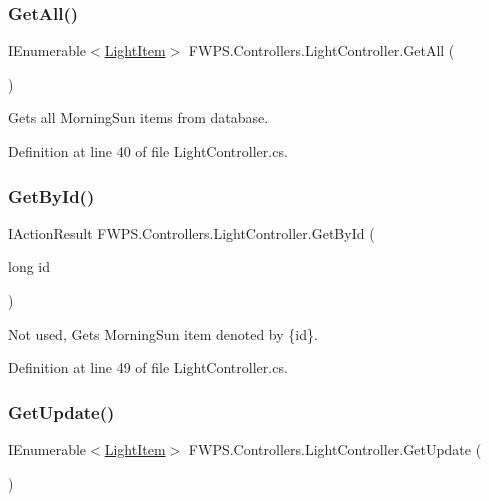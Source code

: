 \subsubsection{\texorpdfstring{Get\+All()}{GetAll()}}
{\footnotesize\ttfamily I\+Enumerable$<$\mbox{\hyperlink{class_f_w_p_s_1_1_models_1_1_light_item}{Light\+Item}}$>$ F\+W\+P\+S.\+Controllers.\+Light\+Controller.\+Get\+All (\begin{DoxyParamCaption}{ }\end{DoxyParamCaption})}



Gets all Morning\+Sun items from database. 



Definition at line 40 of file Light\+Controller.\+cs.

\mbox{\label{class_f_w_p_s_1_1_controllers_1_1_light_controller_a35e585d1b3e493a51f9855f70cca2dc1}} 
\subsubsection{\texorpdfstring{Get\+By\+Id()}{GetById()}}
{\footnotesize\ttfamily I\+Action\+Result F\+W\+P\+S.\+Controllers.\+Light\+Controller.\+Get\+By\+Id (\begin{DoxyParamCaption}\item[{long}]{id }\end{DoxyParamCaption})}



Not used, Gets Morning\+Sun item denoted by \{id\}. 



Definition at line 49 of file Light\+Controller.\+cs.

\mbox{\label{class_f_w_p_s_1_1_controllers_1_1_light_controller_a531d27cca2dfb487ad5120d544cd975d}} 
\subsubsection{\texorpdfstring{Get\+Update()}{GetUpdate()}}
{\footnotesize\ttfamily I\+Enumerable$<$\mbox{\hyperlink{class_f_w_p_s_1_1_models_1_1_light_item}{Light\+Item}}$>$ F\+W\+P\+S.\+Controllers.\+Light\+Controller.\+Get\+Update (\begin{DoxyParamCaption}{ }\end{DoxyParamCaption})}



